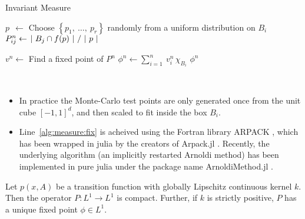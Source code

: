 \begin{algorithm}
    \caption{Invariant Measure}
    \label{alg:measure}
    \begin{spacing}{1.2}
        \begin{algorithmic}[1]

                \State $p\ \ \gets $ Choose $\left\{ p_1,\ \ldots,\ p_r \right\}$ randomly from a uniform distribution on $B_i$
                \State $P_{ij}^n \gets \left. |\ B_j \cap f(p)\ | \ \middle/\ |\ p\ | \right.$
            \EndFor
    
            \State $v^n \gets $ Find a fixed point of $P^n$
            \label{alg:measure:fix}
            \State $\phi^n \gets \sum_{i=1}^n\: v_i^n\, \chi_{B_i}$
            \State \Return $\phi^n$
        \end{algorithmic}
    \end{spacing}
\end{algorithm}

\begin{remark}\ 
    \begin{itemize}
        \item In practice the Monte-Carlo test points are only generated once from the unit cube 
        $[-1,1]^d$, and then scaled to fit inside the box $B_i$.
        \item Line~\ref{alg:measure:fix} is acheived using the Fortran library ARPACK \cite*{ARPACK}, 
        which has been wrapped in julia by the creators of Arpack.jl \cite*{Arpack.jl}. Recently, the 
        underlying algorithm (an implicitly restarted Arnoldi method) has been 
        implemented in pure julia under the package name ArnoldiMethod.jl \cite*{ArnoldiMethod.jl}. \\
    \end{itemize}
\end{remark}

\begin{proposition}
    \cite*{lasota}
    Let $p(x, A)$ be a transition function with globally Lipschitz continuous kernel $k$. 
    Then the operator $P : L^1 \to L^1$ is compact. Further, if $k$ is strictly positive, 
    $P$ has a unique fixed point $\phi \in L^1$. 
\end{proposition}

